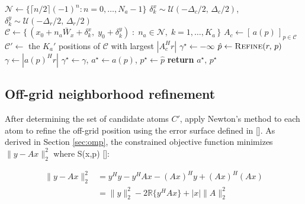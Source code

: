 \begin{algorithm}[ht]
\caption{Ambiguous candidate atom selection}\label{algo:candidates}
\begin{algorithmic}[1]
\State $\mathcal{N} \gets \{\lceil n/2 \rceil(-1)^n : n = 0,\dots,N_a-1\}$
  \State $\delta^x_k \sim \mathcal{U}(-\Delta_c/2,\, \Delta_c/2)$,\quad
         $\delta^y_k \sim \mathcal{U}(-\Delta_r/2,\, \Delta_r/2)$
\EndFor
\State $\mathcal{C} \gets \{\,(x_0 + n_a\bar{W}_x + \delta^x_k,\; y_0 + \delta^y_k)
        \;:\; n_a \in \mathcal{N},\; k = 1,\dots,K_a \,\}$
\State $A_c \gets [\,a(p)\,]_{p \in \mathcal{C}}$
\State $\mathcal{C}' \gets$ the $K_a'$ positions of $\mathcal{C}$ with largest $|A_c^{H}r|$
\State $\gamma^\star \gets -\infty$
  \State $\hat{p} \gets \textsc{Refine}(r,\, p)$
  \State $\gamma \gets |a(p)^{H}r|$
  \If{$\gamma > \gamma^\star$}
    \State $\gamma^\star \gets \gamma$,\; $a^\star \gets a(p)$,\; $p^\star \gets \hat{p}$
  \EndIf
\EndFor
\State \textbf{return} $a^\star,\, p^\star$
\EndProcedure
\end{algorithmic}
\end{algorithm}

\subsection{Off-grid neighborhood refinement}
\label{sec:off_grid}


After determining the set of candidate atoms $C'$, apply Newton's method to each atom to refine the off-grid position using the error surface defined in []. As derived in Section \ref{sec:omp}, the constrained objective function minimizes $\|y - Ax\|_{2}^{2}$ where S(x,p) []:

\begin{equation}
  \begin{aligned}
    \|y - Ax\|_{2}^{2} &= y^{H}y - y^{H}Ax - (Ax)^{H}y + (Ax)^{H}(Ax) \\
    &= \|y\|_{2}^{2} - 2\mathbb{R}\{y^{H}Ax\} + |x|\|A\|_{2}^{2}
  \end{aligned}
  \label{eq:yAx}
\end{equation}

